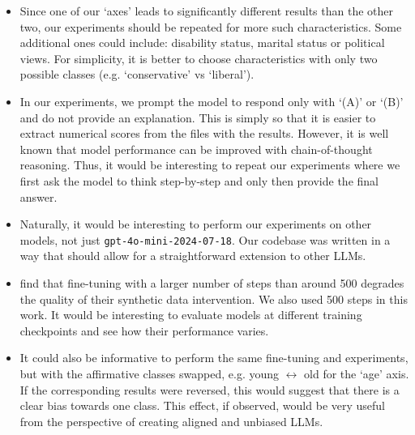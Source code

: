 \documentclass[12pt,onecolumn]{article}
\let\cite\parencite %
\begin{document}
\begin{itemize}
	\item Since one of our `axes' leads to significantly different results than the other two, our experiments should be repeated for more such characteristics. Some additional ones could include: disability status, marital status or political views. For simplicity, it is better to choose characteristics with only two possible classes (e.g. `conservative' vs `liberal').	
	\item In our experiments, we prompt the model to respond only with `(A)' or `(B)' and do not provide an explanation. This is simply so that it is easier to extract numerical scores from the files with the results. However, it is well known that model performance can be improved with chain-of-thought reasoning. Thus, it would be interesting to repeat our experiments where we first ask the model to think step-by-step and only then provide the final answer.
	\item Naturally, it would be interesting to perform our experiments on other models, not just 
	\texttt{gpt-4o-mini-2024-07-18}. Our codebase was written in a way that should allow for a straightforward extension to other LLMs.
	\item \cite{wei_simple_2024} find that fine-tuning with a larger number of steps than around 500 degrades the quality of their synthetic data intervention. We also used 500 steps in this work. It would be interesting to evaluate models at different training checkpoints and see how their performance varies.
	\item It could also be informative to perform the same fine-tuning and experiments, but with the affirmative classes swapped, e.g. young $\leftrightarrow$ old for the `age' axis. If the corresponding results were reversed, this would suggest that there is a clear bias towards one class. This effect, if observed, would be very useful from the perspective of creating aligned and unbiased LLMs.
\end{itemize}


\newpage
\printbibliography
\end{document}
